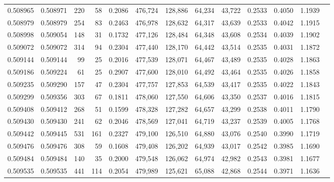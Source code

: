 \begin{tabular}{rrrrrrrrrrrrr}
0.508965 & 0.508971 &   220 &    58 &                                     0.2086 & 476,724 & 128,886 &  64,234 &  43,722 & 0.2533 & 0.4050 & 1.1939 \\
0.508979 & 0.508979 &   254 &    83 &                                     0.2463 & 476,978 & 128,632 &  64,317 &  43,639 & 0.2533 & 0.4042 & 1.1915 \\
0.508998 & 0.509054 &   148 &    31 &                                     0.1732 & 477,126 & 128,484 &  64,348 &  43,608 & 0.2534 & 0.4039 & 1.1902 \\
0.509072 & 0.509072 &   314 &    94 &                                     0.2304 & 477,440 & 128,170 &  64,442 &  43,514 & 0.2535 & 0.4031 & 1.1872 \\
0.509144 & 0.509144 &    99 &    25 &                                     0.2016 & 477,539 & 128,071 &  64,467 &  43,489 & 0.2535 & 0.4028 & 1.1863 \\
0.509186 & 0.509224 &    61 &    25 &                                     0.2907 & 477,600 & 128,010 &  64,492 &  43,464 & 0.2535 & 0.4026 & 1.1858 \\
0.509235 & 0.509290 &   157 &    47 &                                     0.2304 & 477,757 & 127,853 &  64,539 &  43,417 & 0.2535 & 0.4022 & 1.1843 \\
0.509299 & 0.509356 &   303 &    67 &                                     0.1811 & 478,060 & 127,550 &  64,606 &  43,350 & 0.2537 & 0.4016 & 1.1815 \\
0.509408 & 0.509412 &   268 &    51 &                                     0.1599 & 478,328 & 127,282 &  64,657 &  43,299 & 0.2538 & 0.4011 & 1.1790 \\
0.509430 & 0.509430 &   241 &    62 &                                     0.2046 & 478,569 & 127,041 &  64,719 &  43,237 & 0.2539 & 0.4005 & 1.1768 \\
0.509442 & 0.509445 &   531 &   161 &                                     0.2327 & 479,100 & 126,510 &  64,880 &  43,076 & 0.2540 & 0.3990 & 1.1719 \\
0.509476 & 0.509476 &   308 &    59 &                                     0.1608 & 479,408 & 126,202 &  64,939 &  43,017 & 0.2542 & 0.3985 & 1.1690 \\
0.509484 & 0.509484 &   140 &    35 &                                     0.2000 & 479,548 & 126,062 &  64,974 &  42,982 & 0.2543 & 0.3981 & 1.1677 \\
0.509535 & 0.509535 &   441 &   114 &                                     0.2054 & 479,989 & 125,621 &  65,088 &  42,868 & 0.2544 & 0.3971 & 1.1636 \\

\end{tabular}

